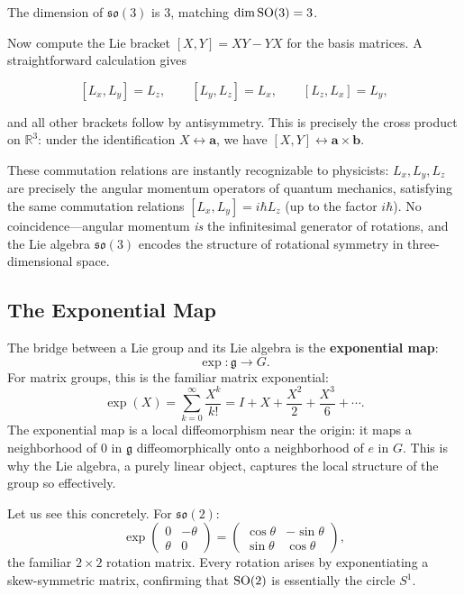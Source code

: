 The dimension of $\mathfrak{so}(3)$ is $3$, matching $\dim \operatorname{SO}(3) = 3$.

Now compute the Lie bracket $[X,Y] = XY - YX$ for the basis matrices. A straightforward calculation gives

\[
[L_x, L_y] = L_z,\qquad
[L_y, L_z] = L_x,\qquad
[L_z, L_x] = L_y,
\]

and all other brackets follow by antisymmetry. This is precisely the cross product on $\mathbb{R}^3$: under the identification $X \leftrightarrow \mathbf{a}$, we have $[X,Y] \leftrightarrow \mathbf{a} \times \mathbf{b}$.

These commutation relations are instantly recognizable to physicists: $L_x, L_y, L_z$ are precisely the angular momentum operators of quantum mechanics, satisfying the same commutation relations $[L_x, L_y] = i\hbar L_z$ (up to the factor $i\hbar$). No coincidence---angular momentum \emph{is} the infinitesimal generator of rotations, and the Lie algebra $\mathfrak{so}(3)$ encodes the structure of rotational symmetry in three-dimensional space.

\subsection{The Exponential Map}

The bridge between a Lie group and its Lie algebra is the \textbf{exponential map}:
\[
    \exp \colon \mathfrak{g} \to G.
\]
For matrix groups, this is the familiar matrix exponential:
\[
    \exp(X) = \sum_{k=0}^{\infty} \frac{X^k}{k!} = I + X + \frac{X^2}{2} + \frac{X^3}{6} + \cdots.
\]
The exponential map is a local diffeomorphism near the origin: it maps a neighborhood of $0$ in $\mathfrak{g}$ diffeomorphically onto a neighborhood of $e$ in $G$. This is why the Lie algebra, a purely linear object, captures the local structure of the group so effectively.

Let us see this concretely. For $\mathfrak{so}(2)$:
\[
\exp\!\begin{pmatrix} 0 & -\theta \\ \theta & 0 \end{pmatrix}
= \begin{pmatrix} \cos\theta & -\sin\theta \\ \sin\theta & \cos\theta \end{pmatrix},
\]
the familiar $2 \times 2$ rotation matrix. Every rotation arises by exponentiating a skew-symmetric matrix, confirming that $\operatorname{SO}(2)$ is essentially the circle $S^1$.

